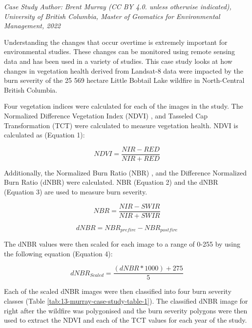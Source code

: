 \documentclass[
]{book}
\begin{document}
\emph{Case Study Author: Brent Murray (CC BY 4.0. unless otherwise indicated), University of British Columbia, Master of Geomatics for Environmental Management, 2022}

Understanding the changes that occur overtime is extremely important for environmental studies. These changes can be monitored using remote sensing data and has been used in a variety of studies. This case study looks at how changes in vegetation health derived from Landsat-8 data were impacted by the burn severity of the 25 569 hectare Little Bobtail Lake wildfire in North-Central British Columbia.

Four vegetation indices were calculated for each of the images in the study. The Normalized Difference Vegetation Index (NDVI) \citep{rouse_monitoring_1974}, and Tasseled Cap Transformation (TCT) \citep{crist_physically-based_1984} were calculated to measure vegetation health. NDVI is calculated as (Equation 1):

\begin{equation}
\tag{1}
  NDVI = \frac{NIR - RED}{NIR + RED}
\end{equation}

Additionally, the Normalized Burn Ratio (NBR) \citep{lopez_garcia_mapping_1991}, and the Difference Normalized Burn Ratio (dNBR) \citep{key_landscape_2006} were calculated. NBR (Equation 2) and the dNBR (Equation 3) are used to measure burn severity.

\begin{equation}
\tag{2}
  NBR = \frac{NIR - SWIR}{NIR + SWIR}
\end{equation}

\begin{equation}
\tag{3}
  dNBR = NBR_{pre fire} - NBR_{post fire}
\end{equation}

The dNBR values were then scaled for each image to a range of 0-255 by using the following equation (Equation 4):

\begin{equation}
\tag{4}
  dNBR_{Scaled} = \frac{(dNBR * 1000) + 275}{5}
\end{equation}

Each of the scaled dNBR images were then classified into four burn severity classes (Table \ref{tab:13-murray-case-study-table-1}). The classified dNBR image for right after the wildfire was polygonised and the burn severity polygons were then used to extract the NDVI and each of the TCT values for each year of the study.
\end{document}
